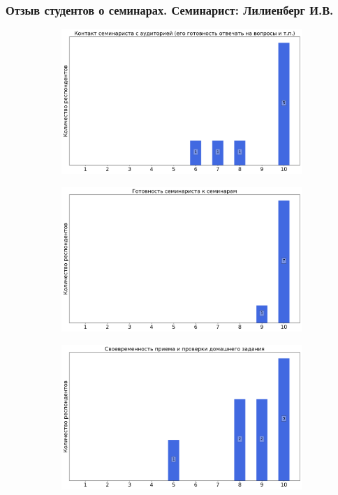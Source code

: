 	\subsubsection{Отзыв студентов о семинарах. Семинарист: Лилиенберг И.В.}		
		\begin{figure}[H]
			\centering
			\begin{subfigure}[b]{0.45\textwidth}
				\centering
				\includegraphics[width=\textwidth]{images/1 course/Общая физика - механика/seminarists-marks-Лилиенберг И.В.-0.png}
			\end{subfigure}
			\begin{subfigure}[b]{0.45\textwidth}
				\centering
				\includegraphics[width=\textwidth]{images/1 course/Общая физика - механика/seminarists-marks-Лилиенберг И.В.-1.png}
			\end{subfigure}
			\begin{subfigure}[b]{0.45\textwidth}
				\centering
				\includegraphics[width=\textwidth]{images/1 course/Общая физика - механика/seminarists-marks-Лилиенберг И.В.-2.png}

\end{subfigure}
\end{figure}
